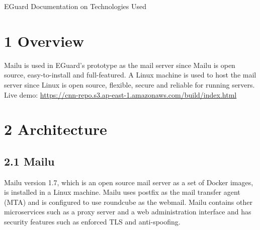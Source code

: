 \documentclass[11pt]{article}
\begin{document}






\begin{center}
\Huge{EGuard Documentation on Technologies Used}
\end{center}

\section*{\large{1 \hspace{10pt} Overview}}
Mailu is used in EGuard's prototype as the mail server since Mailu is open source, easy-to-install and full-featured. A Linux machine is used to host the mail server since Linux is open source, flexible, secure and reliable for running servers.
\\
Live demo: \href{https://cnn-repo.s3.ap-east-1.amazonaws.com/build/index.html}{https://cnn-repo.s3.ap-east-1.amazonaws.com/build/index.html}

\section*{\large{2 \hspace{10pt} Architecture}}
\subsection*{2.1 \hspace{10pt} Mailu}
Mailu version 1.7, which is an open source mail server as a set of Docker images, is installed in a Linux machine. Mailu uses postfix as the mail transfer agent (MTA) and is configured to use roundcube as the webmail. Mailu contains other microservices such as a proxy server and a web administration interface and has security features such as enforced TLS and anti-spoofing.
\end{document}
